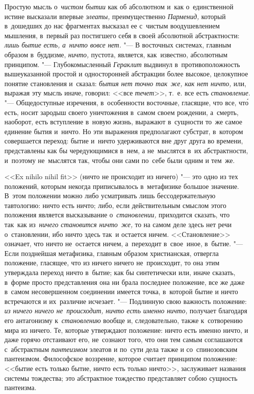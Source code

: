 Простую мысль о~{\em чистом бытии} как об абсолютном и~как о~единственной
истине высказали впервые {\em элеаты,} преимущественно {\em Парменид,} который
в~дошедших до нас фрагментах высказал ее с~чистым воодушевлением мышления,
в~первый раз постигшего себя в своей абсолютной абстрактности:
{\em лишь бытие есть, а~ничто вовсе нет.} "--- В восточных системах, главным
образом в~буддизме, {\em ничто,} пустота, является, как~известно, абсолютным
принципом. "--- Глубокомысленный {\em Гераклит} выдвинул в~противоположность
вышеуказанной простой и односторонней абстракции более высокое, целокупное
понятие становления и~сказал: {\em бытия нет точно так~же, как нет ничто,} или,
выражая эту мысль иначе, говорил: <<все {\em течет}>>, т.~е. все есть
{\em становление}. "--- Общедоступные изречения, в~особенности восточные,
гласящие, что все, чт\'{о} есть, носит зародыш своего уничтожения в~самом своем
рождении, а~смерть, наоборот, есть вступление в~новую жизнь, выражают
в~сущности то~же самое единение бытия и~ничто. Но эти выражения предполагают
субстрат, в~котором совершается переход: бытие и~ничто удерживаются вне друг
друга во времени, представлены как бы чередующимися в~нем, а не~мыслятся в~их
абстрактности, и~поэтому не~мыслятся так, чтобы они сами по~себе были одним и
тем~же.

<<Ex nihilo nihil fit>> (ничто не происходит из ничего) "--- это одно из тех
положений, которым некогда приписывалось в~метафизике большое значение. В~этом
положении можно либо усматривать лишь бессодержательную тавтологию: ничто есть
ничто; либо, если действительным смыслом этого положения является высказывание
о~{\em становлении,} приходится сказать, что так~как из~{\em ничего становится
ничто~же,} то на самом деле здесь нет речи о~становлении, ибо ничто здесь так~и
остается ничем. <<Становление>> означает, что ничто не~остается ничем,
а~переходит в~свое~иное, в~бытие. "--- Если позднейшая метафизика, главным
образом христианская, отвергла положение, гласящее, что из ничего ничего
не~происходит, то она этим утверждала переход ничто в~бытие; как бы
синтетически или, иначе сказать, в~форме просто представления она ни брала
последнее положение, все же даже в~самом несовершенном соединении имеется
точка, в~которой бытие и ничто встречаются и их~различие исчезает. "---
Подлинную свою важность положение: {\em из ничего ничего не~происходит, ничто
есть именно ничто,} получает благодаря его антагонизму к~{\em становлению}
вообще и, следовательно, также к~сотворению мира из ничего. Те, которые
утверждают положение: ничто есть именно ничто, и даже горячо отстаивают его,
не~сознают того, что они тем самым соглашаются с~абстрактным {\em пантеизмом}
элеатов и по~сути дела также и со~спинозовским пантеизмом. Философское
воззрение, которое считает принципом положение: <<бытие есть только бытие,
ничто есть только ничто>>, заслуживает названия системы тождества; это
абстрактное тождество представляет собою сущность пантеизма.

